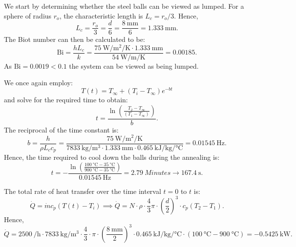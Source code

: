 \begin{derivation}
  We start by determining whether the steel balls can be viewed as lumped.
  For a sphere of radius $r_o$, the characteristic length is $L_c = r_o / 3$.
  Hence,
  \begin{equation*}
    L_c = \frac{r_o}{3} = \frac{d}{6} = \frac{\qty{8}{\mm} }{6} = \qty{1.333}{\milli\meter}
  .\end{equation*}
  The Biot number can then be calculated to be:
  \begin{equation*}
    \mathrm{Bi} = \frac{h L_c}{k} = \frac{\qty{75}{\W\per\m\squared\per\K} \cdot \qty{1,333}{\mm}}{\qty{54}{\W\per\m\per\K} } = \num{0.00185}
  .\end{equation*}
  As $\mathrm{Bi} = \num{0,0019} < \num{0,1}$ the system can be viewed as being lumped. 

  We once again employ:
  \begin{equation*}
    T(t) = T_{\infty} + \left( T_i - T_{\infty} \right) e^{-bt}
  \end{equation*}
  and solve for the required time to obtain:
  \begin{equation*}
    t = \frac{\ln \left( \frac{T_2 - T_{\infty}}{\left( T_1 - T_{\infty} \right)} \right)}{b}
  .\end{equation*}
  The reciprocal of the time constant is:
  \begin{equation*}
    b = \frac{h}{\rho L_c c_p} = \frac{\qty{75}{\W\per\m\squared\per\K}}{\qty{7833}{\kg\per\m\cubed} \cdot \qty{1,333}{\mm} \cdot \qty{0,465}{\kJ\per\kg\per\celsius} } = \qty{0.01545}{\hertz}
  .\end{equation*}
  Hence, the time required to cool down the balls during the annealing is:
  \begin{equation*}
    t = -\frac{\ln \left( \frac{\qty{100}{\celsius} - \qty{35}{\celsius}}{\qty{900}{\celsius} - \qty{35}{\celsius}} \right)}{\qty{0,01545}{\hertz} } = \qty{2.79}{Minutes} \rightarrow \qty{167.4}{\second}
  .\end{equation*}

  The total rate of heat transfer over the time interval $t = 0$ to $t$ is:
  \begin{equation*}
    \dot{Q} = \dot{m} c_p \left( T(t) - T_i \right) \implies \dot{Q} = N \cdot \rho \cdot \frac{4}{3} \pi \cdot \left( \frac{d}{2} \right)^3 \cdot c_p \left( T_2 - T_{1}\right)
  .\end{equation*}
  Hence,
  \begin{equation*}
  \dot{Q} = \qty{2500}{\per\hour} \cdot  \qty{7833}{\kg\per\m\cubed} \cdot \frac{4}{3} \cdot \pi \cdot \left( \frac{\qty{8}{\mm}}{2} \right)^3 \cdot \qty{0,465}{\kJ\per\kg\per\celsius} \cdot \left( \qty{100}{\celsius} - \qty{900}{\celsius}  \right)  = \qty{-0.5425}{\kilo\watt}
.\end{equation*}
\end{derivation}

